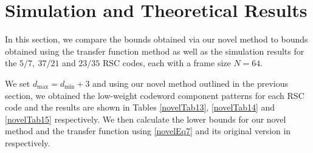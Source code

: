 \section{Simulation and Theoretical Results}
\label{sec5}
In this section, we compare the bounds obtained via our novel method to bounds obtained using the transfer function method as well as the simulation results for the $5/7,~37/21$ and $23/35$ RSC codes, each with a frame size $N=64$. 

We set $d_{\text{max}}=d_{\text{min}}+3$ and using our novel method outlined in the previous section,  we obtained the low-weight codeword component patterns for each RSC code and the results are shown in Tables \ref{novelTab13},  \ref{novelTab14} and \ref{novelTab15} respectively. We then calculate the lower bounds for our novel method and the transfer function using \eqref{novelEq7} and its original version in \cite{ref4} respectively. 
